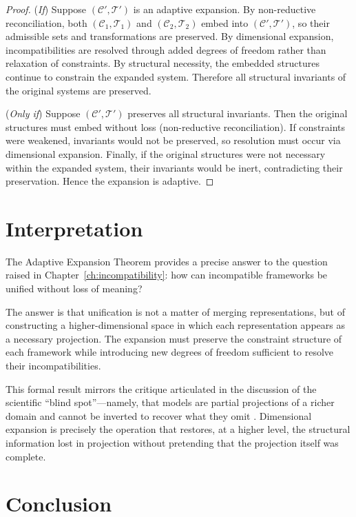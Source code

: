 \documentclass[11pt,openany]{book}
\begin{document}
\begin{proof}
(\emph{If}) Suppose $(\mathcal{C}', \mathcal{T}')$ is an
adaptive expansion. By non-reductive reconciliation, both
$(\mathcal{C}_1, \mathcal{T}_1)$ and
$(\mathcal{C}_2, \mathcal{T}_2)$ embed into
$(\mathcal{C}', \mathcal{T}')$, so their admissible sets and
transformations are preserved. By dimensional expansion,
incompatibilities are resolved through added degrees of
freedom rather than relaxation of constraints. By structural
necessity, the embedded structures continue to constrain the
expanded system. Therefore all structural invariants of the
original systems are preserved.

(\emph{Only if}) Suppose
$(\mathcal{C}', \mathcal{T}')$ preserves all structural
invariants. Then the original structures must embed without
loss (non-reductive reconciliation). If constraints were
weakened, invariants would not be preserved, so resolution
must occur via dimensional expansion. Finally, if the
original structures were not necessary within the expanded
system, their invariants would be inert, contradicting their
preservation. Hence the expansion is adaptive.
\end{proof}

\section{Interpretation}
\label{sec:interpretation-expansion}

The Adaptive Expansion Theorem provides a precise answer to
the question raised in Chapter~\ref{ch:incompatibility}:
how can incompatible frameworks be unified without loss of
meaning?

The answer is that unification is not a matter of merging
representations, but of constructing a higher-dimensional
space in which each representation appears as a necessary
projection. The expansion must preserve the constraint
structure of each framework while introducing new degrees of
freedom sufficient to resolve their incompatibilities.

This formal result mirrors the critique articulated in the
discussion of the scientific ``blind spot''—namely, that
models are partial projections of a richer domain and cannot
be inverted to recover what they omit .
Dimensional expansion is precisely the operation that
restores, at a higher level, the structural information lost
in projection without pretending that the projection itself
was complete.

\section{Conclusion}
\label{sec:conclusion-expansion}
\end{document}
